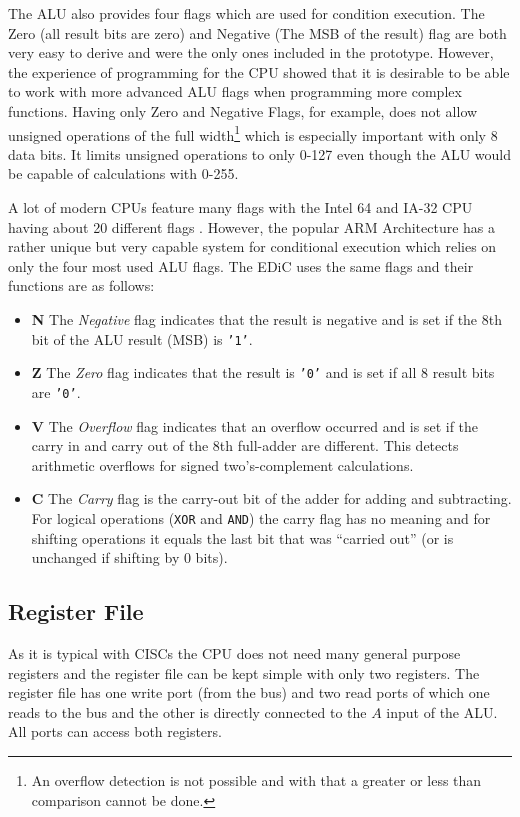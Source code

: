 The \gls{ALU} also provides four flags which are used for condition execution.
The Zero (all result bits are zero) and Negative (The \gls{MSB} of the result) flag are both very easy to derive and were the only ones included in the prototype.
However, the experience of programming for the \gls{CPU} showed that it is desirable to be able to work with more advanced \gls{ALU} flags when programming more complex functions.
Having only Zero and Negative Flags, for example, does not allow unsigned operations of the full width\footnote{An overflow detection is not possible and with that a greater or less than comparison cannot be done.} which is especially important with only 8 data bits.
It limits unsigned operations to only 0-127 even though the \gls{ALU} would be capable of calculations with 0-255.

A lot of modern \glspl{CPU} feature many flags with the Intel 64\textsuperscript{\textregistered} and IA-32 \gls{CPU} having about 20 different flags \cite[Section~3.4.3]{intelx86}.
However, the popular ARM Architecture has a rather unique but very capable system for conditional execution which relies on only the four most used \gls{ALU} flags.
The \gls{EDiC} uses the same flags and their functions are as follows:
\begin{itemize}
  \item \textbf{N} The \emph{Negative} flag indicates that the result is negative and is set if the 8th bit of the \gls{ALU} result (\gls{MSB}) is \texttt{'1'}.
  \item \textbf{Z} The \emph{Zero} flag indicates that the result is \texttt{'0'} and is set if all 8 result bits are \texttt{'0'}.
  \item \textbf{V} The \emph{Overflow} flag indicates that an overflow occurred and is set if the carry in and carry out of the 8th full-adder are different.
  This detects arithmetic overflows for signed two's-complement calculations.
  \item \textbf{C} The \emph{Carry} flag is the carry-out bit of the adder for adding and subtracting.
  For logical operations (\texttt{XOR} and \texttt{AND}) the carry flag has no meaning and for shifting operations it equals the last bit that was ``carried out'' (or is unchanged if shifting by 0 bits).
\end{itemize}
\subsection{Register File}\label{sec:regs}
As it is typical with \glspl{CISC} the \gls{CPU} does not need many general purpose registers and the register file can be kept simple with only two registers.
The register file has one write port (from the bus) and two read ports of which one reads to the bus and the other is directly connected to the $A$ input of the \gls{ALU}.
All ports can access both registers.
